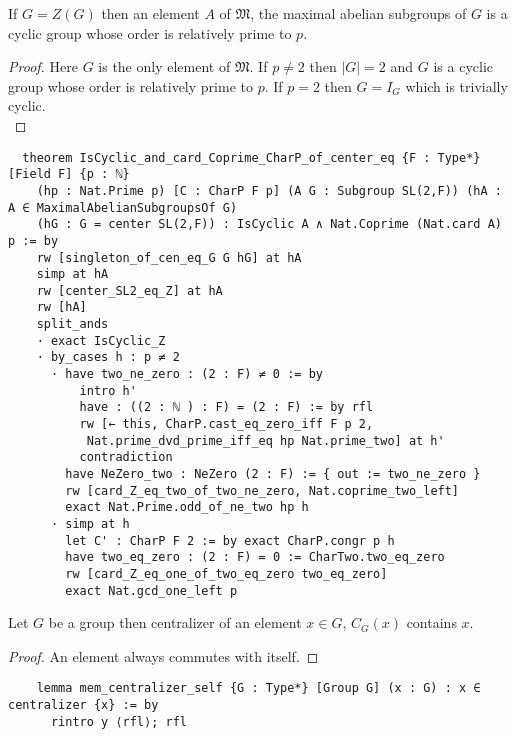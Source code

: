 \begin{lemma}
  \label{MaximalAbelianSubgroup.IsCyclic_and_card_Coprime_CharP_of_center_eq}
  \leanok
  If $G = Z(G)$ then an element $A$ of $\mathfrak{M}$, the maximal abelian subgroups of $G$ is a cyclic group whose order is relatively prime to $p$.
\end{lemma}
\begin{proof}
\leanok
  Here $G$ is the only element of $\mathfrak{M}$. If $p \neq 2$ then $|G|=2$ and $G$ is a cyclic group whose order is relatively prime to $p$. If $p=2$ then $G = I_G$ which is trivially cyclic. \\
\end{proof}
\begin{footnotesize}
  \begin{verbatim}
  theorem IsCyclic_and_card_Coprime_CharP_of_center_eq {F : Type*} [Field F] {p : ℕ}
    (hp : Nat.Prime p) [C : CharP F p] (A G : Subgroup SL(2,F)) (hA : A ∈ MaximalAbelianSubgroupsOf G)
    (hG : G = center SL(2,F)) : IsCyclic A ∧ Nat.Coprime (Nat.card A) p := by
    rw [singleton_of_cen_eq_G G hG] at hA
    simp at hA
    rw [center_SL2_eq_Z] at hA
    rw [hA]
    split_ands
    · exact IsCyclic_Z
    · by_cases h : p ≠ 2
      · have two_ne_zero : (2 : F) ≠ 0 := by
          intro h'
          have : ((2 : ℕ ) : F) = (2 : F) := by rfl
          rw [← this, CharP.cast_eq_zero_iff F p 2,
           Nat.prime_dvd_prime_iff_eq hp Nat.prime_two] at h'
          contradiction
        have NeZero_two : NeZero (2 : F) := { out := two_ne_zero }
        rw [card_Z_eq_two_of_two_ne_zero, Nat.coprime_two_left]
        exact Nat.Prime.odd_of_ne_two hp h
      · simp at h
        let C' : CharP F 2 := by exact CharP.congr p h
        have two_eq_zero : (2 : F) = 0 := CharTwo.two_eq_zero
        rw [card_Z_eq_one_of_two_eq_zero two_eq_zero]
        exact Nat.gcd_one_left p
  \end{verbatim}
  \end{footnotesize}

\begin{corollary}
  \label{mem_centralizer_self}
  \leanok
 Let $G$ be a group then centralizer of an element $x \in G$, $C_G(x)$ contains $x$. 
\end{corollary}
\begin{proof}
  \leanok
  An element always commutes with itself.
\end{proof}
\begin{footnotesize}
  \begin{verbatim}
    lemma mem_centralizer_self {G : Type*} [Group G] (x : G) : x ∈ centralizer {x} := by
      rintro y ⟨rfl⟩; rfl
  \end{verbatim}
\end{footnotesize}

